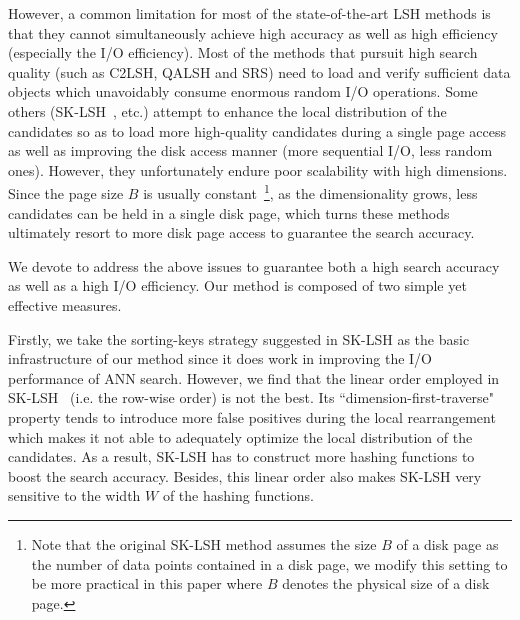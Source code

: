 \documentclass[twocolumn]{svjour3}          %
\begin{document}
However, a common limitation for most of the state-of-the-art LSH methods is that they cannot simultaneously achieve high accuracy as well as high efficiency (especially the I/O efficiency).
Most of the methods that pursuit high search quality (such as C2LSH, QALSH and SRS) need to load and verify sufficient data objects which unavoidably consume enormous random I/O operations.
Some others (SK-LSH~\cite{Liu2014SKLSH}, etc.) attempt to enhance the local distribution of the candidates so as to load more high-quality candidates during a single page access as well as improving the disk access manner (more sequential I/O, less random ones). However, they unfortunately endure poor scalability with high dimensions. Since the page size $B$ is usually constant~\footnote{Note that the original SK-LSH method assumes the size $B$ of a disk page as the number of data points contained in a disk page, we modify this setting to be more practical in this paper where $B$ denotes the physical size of a disk page.}, as the dimensionality grows, less candidates can be held in a single disk page, which turns these methods ultimately resort to more disk page access to guarantee the search accuracy.

We devote to address the above issues to guarantee both a high search accuracy as well as a high I/O efficiency. Our method is composed of two simple yet effective measures.

Firstly, we take the sorting-keys strategy suggested in SK-LSH as the basic infrastructure of our method since it does work in improving the I/O performance of ANN search.
However, we find that the linear order employed in SK-LSH~\cite{Liu2014SKLSH} (i.e. the row-wise order) is not the best. Its ``dimension-first-traverse" property tends to introduce more false positives during the local rearrangement which makes it not able to adequately optimize the local distribution of the candidates. As a result, SK-LSH has to construct more hashing functions to boost the search accuracy. Besides, this linear order also makes SK-LSH very sensitive to the width $W$ of the hashing functions.
\end{document}
